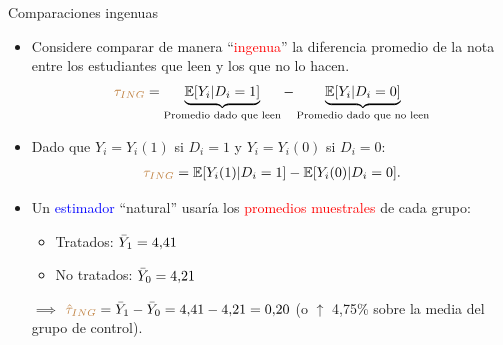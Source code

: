 \documentclass[10pt, xcolor=dvipsnames]{beamer}
\begin{document}
\begin{frame}{Comparaciones ingenuas}
\begin{itemize}
    \item Considere comparar de manera ``\textcolor{red}{ingenua}'' la diferencia promedio de la nota entre los estudiantes que leen y los que no lo hacen.
    \begin{align*}
        \textcolor{brown}{\tau_{ING}} = \underbrace{\operatorname{\mathbb{E}}[Y_i|D_i=1]}_{\text{Promedio dado que leen}} - \underbrace{\operatorname{\mathbb{E}}[Y_i|D_i=0]}_{\text{Promedio dado que no leen}}
    \end{align*}
    \vspace{-0.25em}
    \item Dado que \(Y_i = Y_i(1)\) si \(D_i=1\) y \(Y_i = Y_i(0)\) si \(D_i=0\):
    \begin{align*}
        \textcolor{brown}{\tau_{ING}} = \operatorname{\mathbb{E}}[Y_i(1)|D_i=1] - \operatorname{\mathbb{E}}[Y_i(0)|D_i=0].  
    \end{align*}
    \vspace{-0.75em}
    \item Un \textcolor{blue}{estimador} ``natural'' usaría los \textcolor{red}{promedios muestrales} de cada grupo: %
    \vspace{0.0em}
    \begin{itemize}
        \item Tratados: \(\Bar{Y}_1 = 4{,}41\) 
        \item No tratados: \(\Bar{Y}_0 = 4{,}21\) 
    \end{itemize}
    \vspace{0.0em}
    \(\implies\) \(\textcolor{brown}{\hat{\tau}_{ING}} = \Bar{Y}_1 - \Bar{Y}_0 = 4{,}41 - 4{,}21  = 0{,}20\) (o \(\uparrow\) 4,75\% sobre la media del grupo de control).
\end{itemize}
\end{frame}
\end{document}
